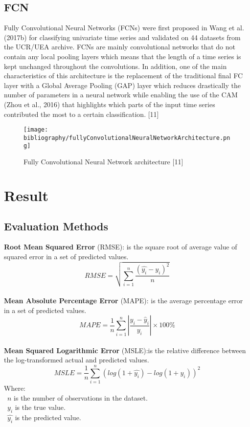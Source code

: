 \documentclass{ieeeojies}
\begin{document}
\subsection{FCN}
Fully Convolutional Neural Networks (FCNs) were first proposed in Wang et al. (2017b) for classifying univariate time series and validated on 44 datasets from the UCR/UEA archive. FCNs are mainly convolutional networks that do not contain any local pooling layers which means that the length of a time series is kept unchanged throughout the convolutions. In addition, one of the main characteristics of this architecture is the replacement of the traditional final FC layer with a Global Average Pooling (GAP) layer which reduces drastically the number of parameters in a neural network while enabling the use of the CAM (Zhou et al., 2016) that highlights which parts of the input time series contributed the most to a certain classification.  [11]
\begin{figure}[H]
    \centering
    \begin{minipage}{1\linewidth}
        \centering
        \texttt{[image: bibliography/fullyConvolutionalNeuralNetworkArchitecture.png]}
        \caption{Fully Convolutional Neural Network architecture [11]}
        \label{fig11}
    \end{minipage}
\end{figure}

\section{Result}
\subsection{Evaluation Methods}
\textbf{Root Mean Squared Error} (RMSE): is the square root of average value of squared error in a set of predicted values.\\
\[RMSE=\sqrt{\sum_{i=1}^{n} \frac{(\hat{y_i}-y_i )^2}{n} }\]\\
\textbf{Mean Absolute Percentage Error} (MAPE): is the average percentage error in a set of predicted values.\\
\[MAPE = \frac{1}{n} \sum_{i=1}^{n} \left| \frac{y_i - \hat{y}_i}{y_i} \right| \times 100\%\]\\
\textbf{Mean Squared Logarithmic Error} (MSLE):is the relative difference between the log-transformed actual and predicted values.\\
\[MSLE=\frac{1}{n}\sum_{i=1}^{n}(log(1+\hat{y_i})-log(1+y_i))^2\]
Where: \\
	\indent\textbullet\ \(n\) is the number of observations in the dataset.\\
	\indent\textbullet\ \(y_i\)  is the true value.\\
	\indent\textbullet\ \(\hat{y_i}\) is the predicted value.
\end{document}
